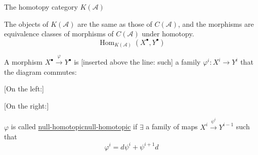 \documentclass[11pt]{article}
\theoremstyle{definition}
\theoremstyle{remark}
\let\DiplomaticMathUnderline\underline
\renewcommand{\underline}[1]{\ifmmode\DiplomaticMathUnderline{#1}\else\uline{#1}\fi}
\begin{document}
The homotopy category $K(\mathcal A)$

The objects of $K(\mathcal A)$ are the same as those of $C(\mathcal A)$, and the morphisms are equivalence classes
of morphisms of $C(\mathcal A)$ under homotopy.
\begin{equation*}
\operatorname{Hom}_{K(\mathcal A)}(X^\bullet,Y^\bullet)
\end{equation*}

A morphism $X^\bullet\overset{\varphi}{\longrightarrow}Y^\bullet$ is [inserted above the line: such]
a family $\varphi^i\colon X^i\longrightarrow Y^i$ that the diagram commutes:

\par\noindent\begin{minipage}{\linewidth}\vspace{0pt}
[On the left:]
\par\nopagebreak[4]
\begin{center}
\end{center}
\end{minipage}\par
\par\noindent\begin{minipage}{\linewidth}\vspace{0pt}
[On the right:]
\par\nopagebreak[4]
\begin{center}
\end{center}
\end{minipage}\par
[A wavy line goes around the left diagram above and on the right, then passes beneath the right diagram.]

$\varphi$ is called \underline{null-homotopic} if $\exists$ a family of maps
$X^i\overset{\psi^i}{\longrightarrow}Y^{i-1}$
such that
\begin{equation*}
\varphi^i=d\psi^i+\psi^{i+1}d\tag{1}
\end{equation*}
\end{document}
